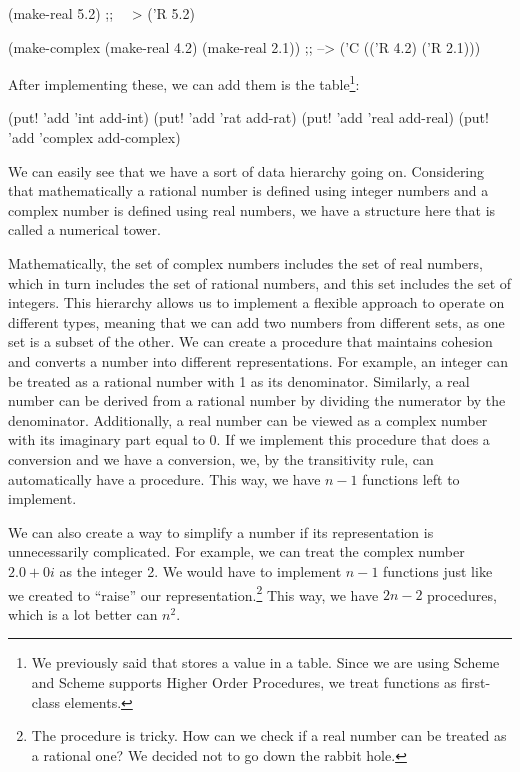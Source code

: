 \begin{code}
(make-real 5.2) ;; ~~> ('R 5.2)

(make-complex (make-real 4.2) (make-real 2.1)) ;; --> ('C (('R 4.2) ('R 2.1)))
\end{code}

After implementing these, we can add them is the table\footnote{We previously said that  stores a value in a table. Since we are using Scheme and Scheme supports Higher Order Procedures, we treat functions as first-class elements.}:

\begin{code}
(put! 'add 'int add-int)
(put! 'add 'rat add-rat)
(put! 'add 'real add-real)
(put! 'add 'complex add-complex)
\end{code}

We can easily see that we have a sort of data hierarchy going on. Considering that mathematically a rational number is defined using integer numbers and a complex number is defined using real numbers, we have a structure here that is called a numerical tower.

Mathematically, the set of complex numbers includes the set of real numbers, which in turn includes the set of rational numbers, and this set includes the set of integers. This hierarchy allows us to implement a flexible approach to operate on different types, meaning that we can add two numbers from different sets, as one set is a subset of the other. We can create a procedure that maintains cohesion and converts a number into different representations. For example, an integer can be treated as a rational number with 1 as its denominator. Similarly, a real number can be derived from a rational number by dividing the numerator by the denominator. Additionally, a real number can be viewed as a complex number with its imaginary part equal to 0. If we implement this procedure that does a  conversion and we have a  conversion, we, by the transitivity rule, can automatically have a  procedure. This way, we have $n-1$ functions left to implement.

We can also create a way to simplify a number if its representation is unnecessarily complicated. For example, we can treat the complex number $2.0 + 0i$ as the integer 2. We would have to implement $n-1$ functions just like we created to ``raise'' our representation.\footnote{The procedure  is tricky. How can we check if a real number can be treated as a rational one? We decided not to go down the rabbit hole.} This way, we have $2n - 2$ procedures, which is a lot better can $n^2$.

